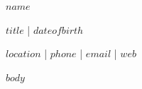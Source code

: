\documentclass[10pt]{article}
\begin{document}
{\Huge \textbf{$name$}}

\vspace{4pt}

{\large $title$ \quad | \quad $dateofbirth$}

\vspace{6pt}

$location$ \quad | \quad $phone$ \quad | \quad $email$ \quad | \quad $web$

\vspace{10pt}

$body$
\end{document}

